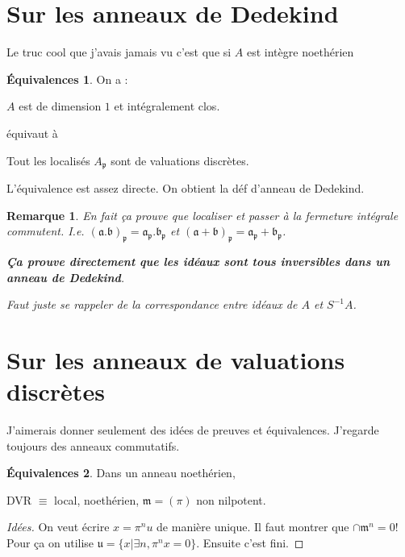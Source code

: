 \documentclass[a4paper,12pt]{book}
\newcommand{\m}{\mathfrak m}
\renewcommand{\b}{\mathfrak b}
\renewcommand{\a}{\mathfrak a}
\newcommand{\p}{\mathfrak p}
\theoremstyle{plain}
\newtheorem{rem}{Remarque}
\theoremstyle{definition}
\newtheorem*{eq}{Équivalences}
\theoremstyle{remark}
\begin{document}
\section{Sur les anneaux de Dedekind}
Le truc cool que j'avais jamais vu c'est que si $A$ est intègre 
noethérien
\begin{eq}
    On a :
    \begin{center}
	$A$ est de dimension $1$ et intégralement clos.
    \end{center}
    équivaut à
    \begin{center}
	Tout les localisés $A_{\p}$ sont de valuations discrètes.
    \end{center}
\end{eq}
L'équivalence est assez directe. On obtient la déf d'anneau de Dedekind.
\begin{rem}
    En fait ça prouve que localiser et passer à la fermeture intégrale
    commutent. I.e. $(\a.\b)_{\p}=\a_{\p}.\b_{\p}$ et 
    $(\a+\b)_{\p}=\a_{\p}+\b_{\p}$.
    \begin{center}
	\textbf{Ça prouve directement que 
	les idéaux sont tous inversibles dans un anneau de Dedekind}.
    \end{center}
    Faut juste se rappeler de la correspondance entre idéaux de 
    $A$ et $S^{-1}A$.
\end{rem}
\section{Sur les anneaux de valuations discrètes}
J'aimerais donner seulement des idées de preuves et équivalences.
J'regarde toujours des anneaux commutatifs.

\begin{eq}
    Dans un anneau noethérien, 
    \begin{center}
	DVR $\equiv$ local, noethérien, $\m=(\pi)$ non nilpotent.
    \end{center}
\end{eq}
\begin{proof}[Idées]
    On veut écrire $x=\pi^n u$ de manière unique. Il faut montrer que
    $\cap \m^n = 0$! Pour ça on utilise $\mathfrak u = \{x|\exists n, \pi^n x=0\}$. Ensuite c'est fini.
\end{proof}
\end{document}
